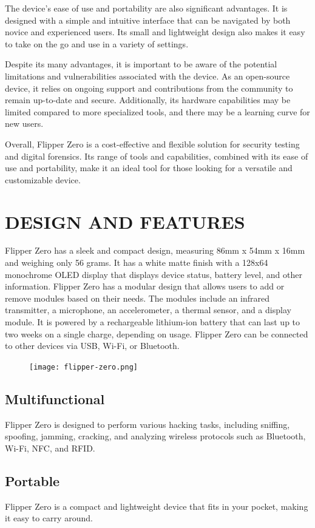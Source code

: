 \documentclass[a4paper,11pt]{report}
\begin{document}
The device's ease of use and portability are also significant advantages. It is designed with a simple and intuitive interface that can be navigated by both novice and experienced users. Its small and lightweight design also makes it easy to take on the go and use in a variety of settings.

Despite its many advantages, it is important to be aware of the potential limitations and vulnerabilities associated with the device. As an open-source device, it relies on ongoing support and contributions from the community to remain up-to-date and secure. Additionally, its hardware capabilities may be limited compared to more specialized tools, and there may be a learning curve for new users.

Overall, Flipper Zero is a cost-effective and flexible solution for security testing and digital forensics. Its range of tools and capabilities, combined with its ease of use and portability, make it an ideal tool for those looking for a versatile and customizable device.
  
\chapter{DESIGN AND FEATURES}
Flipper Zero has a sleek and compact design, measuring 86mm x 54mm x 16mm and weighing only 56 grams. It has a white matte finish with a 128x64 monochrome OLED display that displays device status, battery level, and other information. Flipper Zero has a modular design that allows users to add or remove modules based on their needs. The modules include an infrared transmitter, a microphone, an accelerometer, a thermal sensor, and a display module. It is powered by a rechargeable lithium-ion battery that can last up to two weeks on a single charge, depending on usage. Flipper Zero can be connected to other devices via USB, Wi-Fi, or Bluetooth.
\begin{figure}[h]
	\centering
	\hspace{21pt}
	\texttt{[image: flipper-zero.png]}
	\label{fig:type.png}
\end{figure}
\section{Multifunctional}
Flipper Zero is designed to perform various hacking tasks, including sniffing, spoofing, jamming, cracking, and analyzing wireless protocols such as Bluetooth, Wi-Fi, NFC, and RFID.
\section{Portable}
Flipper Zero is a compact and lightweight device that fits in your pocket, making it easy to carry around.
\end{document}
